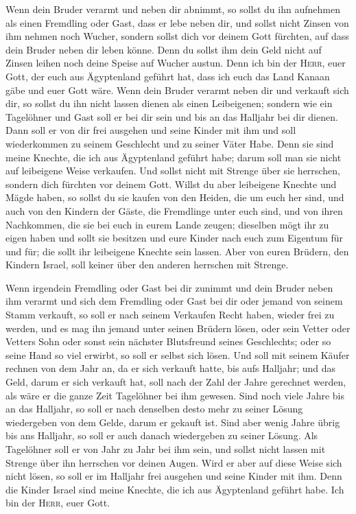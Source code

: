 Wenn dein Bruder verarmt und neben dir abnimmt, so
sollst du ihn aufnehmen als einen Fremdling oder Gast, dass er lebe
neben dir,  und sollst nicht Zinsen von ihm nehmen noch
Wucher, sondern sollst dich vor deinem Gott fürchten, auf dass dein
Bruder neben dir leben könne.  Denn du sollst ihm dein
Geld nicht auf Zinsen leihen noch deine Speise auf Wucher austun.
 Denn ich bin der \textsc{Herr}, euer Gott, der euch aus
Ägyptenland geführt hat, dass ich euch das Land Kanaan gäbe und euer
Gott wäre.  Wenn dein Bruder verarmt neben dir und
verkauft sich dir, so sollst du ihn nicht lassen dienen als einen
Leibeigenen;  sondern wie ein Tagelöhner und Gast soll er
bei dir sein und bis an das Halljahr bei dir dienen. 
Dann soll er von dir frei ausgehen und seine Kinder mit ihm und soll
wiederkommen zu seinem Geschlecht und zu seiner Väter Habe.
 Denn sie sind meine Knechte, die ich aus Ägyptenland
geführt habe; darum soll man sie nicht auf leibeigene Weise verkaufen.
 Und sollst nicht mit Strenge über sie herrschen, sondern
dich fürchten vor deinem Gott.  Willst du aber leibeigene
Knechte und Mägde haben, so sollst du sie kaufen von den Heiden, die um
euch her sind,  und auch von den Kindern der Gäste, die
Fremdlinge unter euch sind, und von ihren Nachkommen, die sie bei euch
in eurem Lande zeugen; dieselben mögt ihr zu eigen haben 
und sollt sie besitzen und eure Kinder nach euch zum Eigentum für und
für; die sollt ihr leibeigene Knechte sein lassen. Aber von euren
Brüdern, den Kindern Israel, soll keiner über den anderen herrschen mit
Strenge.

 Wenn irgendein Fremdling oder Gast bei dir zunimmt und
dein Bruder neben ihm verarmt und sich dem Fremdling oder Gast bei dir
oder jemand von seinem Stamm verkauft,  so soll er nach
seinem Verkaufen Recht haben, wieder frei zu werden, und es mag ihn
jemand unter seinen Brüdern lösen,  oder sein Vetter oder
Vetters Sohn oder sonst sein nächster Blutsfreund seines Geschlechts;
oder so seine Hand so viel erwirbt, so soll er selbst sich lösen.
 Und soll mit seinem Käufer rechnen von dem Jahr an, da
er sich verkauft hatte, bis aufs Halljahr; und das Geld, darum er sich
verkauft hat, soll nach der Zahl der Jahre gerechnet werden, als wäre er
die ganze Zeit Tagelöhner bei ihm gewesen.  Sind noch
viele Jahre bis an das Halljahr, so soll er nach denselben desto mehr zu
seiner Lösung wiedergeben von dem Gelde, darum er gekauft ist.
 Sind aber wenig Jahre übrig bis ans Halljahr, so soll er
auch danach wiedergeben zu seiner Lösung.  Als Tagelöhner
soll er von Jahr zu Jahr bei ihm sein, und sollst nicht lassen mit
Strenge über ihn herrschen vor deinen Augen.  Wird er
aber auf diese Weise sich nicht lösen, so soll er im Halljahr frei
ausgehen und seine Kinder mit ihm.  Denn die Kinder
Israel sind meine Knechte, die ich aus Ägyptenland geführt habe. Ich bin
der \textsc{Herr}, euer Gott.

